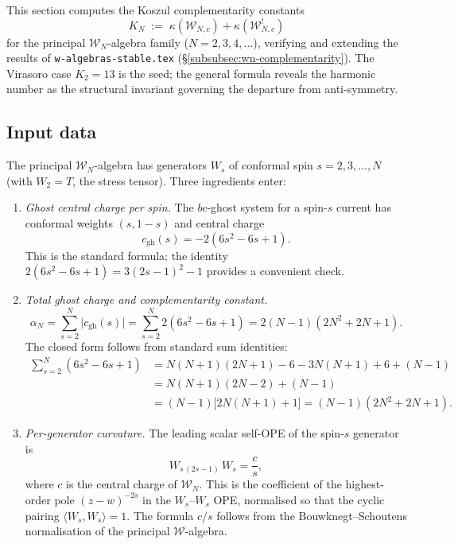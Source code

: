 \documentclass[11pt]{article}
\newcommand{\cW}{\mathcal{W}}
\begin{document}
\noindent
This section computes the Koszul complementarity constants
\[
K_N \;:=\; \kappa(\cW_{N,c}) + \kappa(\cW_{N,c}^!)
\]
for the principal $\cW_N$-algebra family ($N = 2, 3, 4, \ldots$),
verifying and extending the results of
\texttt{w-algebras-stable.tex} (\S\ref{subsubsec:wn-complementarity}).
The Virasoro case $K_2 = 13$ is the seed; the general formula
reveals the harmonic number as the structural invariant governing
the departure from anti-symmetry.

\subsection*{Input data}

The principal $\cW_N$-algebra has generators
$W_s$ of conformal spin $s = 2, 3, \ldots, N$ (with $W_2 = T$,
the stress tensor).  Three ingredients enter:

\begin{enumerate}[label=(\arabic*)]
\item \emph{Ghost central charge per spin.}
  The $bc$-ghost system for a spin-$s$ current has conformal
  weights $(s, 1-s)$ and central charge
  \[
  c_{\mathrm{gh}}(s) = -2(6s^2 - 6s + 1).
  \]
  This is the standard formula; the identity
  $2(6s^2 - 6s + 1) = 3(2s-1)^2 - 1$ provides a convenient check.

\item \emph{Total ghost charge and complementarity constant.}
  \[
  \alpha_N
  = \sum_{s=2}^{N} \bigl|c_{\mathrm{gh}}(s)\bigr|
  = \sum_{s=2}^{N} 2(6s^2 - 6s + 1)
  = 2(N-1)(2N^2 + 2N + 1).
  \]
  The closed form follows from standard sum identities:
  \begin{align*}
  \sum_{s=2}^{N}(6s^2 - 6s + 1)
  &= N(N+1)(2N+1) - 6 - 3N(N+1) + 6 + (N-1) \\
  &= N(N+1)(2N-2) + (N-1) \\
  &= (N-1)\bigl[2N(N+1) + 1\bigr]
  = (N-1)(2N^2 + 2N + 1).
  \end{align*}

\item \emph{Per-generator curvature.}
  The leading scalar self-OPE of the spin-$s$ generator is
  \[
  W_{s\,(2s-1)}\,W_s = \frac{c}{s},
  \]
  where $c$ is the central charge of $\cW_N$.  This is the
  coefficient of the highest-order pole $(z-w)^{-2s}$ in the
  $W_s$--$W_s$ OPE, normalised so that the cyclic pairing
  $\langle W_s, W_s \rangle = 1$.  The formula $c/s$ follows from
  the Bouwknegt--Schoutens normalisation of the principal
  $\cW$-algebra.
\end{enumerate}
\end{document}
